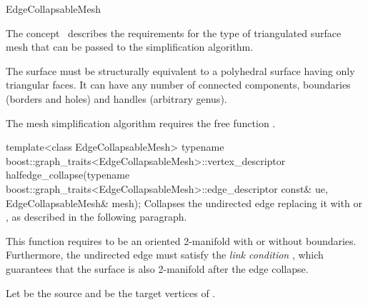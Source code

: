 
\begin{ccRefConcept}{EdgeCollapsableMesh}


\ccDefinition

The concept \ccRefName\ describes the requirements for the type of 
triangulated surface mesh that can be passed to the
simplification algorithm.

The surface must be structurally equivalent to a polyhedral surface
having only triangular faces. 
It can have any number of connected components, boundaries 
(borders and holes) and handles (arbitrary genus).

\ccRefines
{}


The mesh simplification algorithm requires the free function .
\ccTagFullDeclarations

  \ccFunction
  {template<class EdgeCollapsableMesh>
  typename boost::graph_traits<EdgeCollapsableMesh>::vertex_descriptor
  halfedge_collapse(typename boost::graph_traits<EdgeCollapsableMesh>::edge_descriptor const& ue,
                             EdgeCollapsableMesh& mesh);}  
  {Collapses the undirected edge  replacing it with  or ,
   as described in the following paragraph.}

    

\ccPrecond This function requires  to be an oriented 2-manifold with or without boundaries. Furthermore, the undirected edge  must satisfy the {\em link condition} 
\cite{degn-tpec-98}, which guarantees that the surface is also 2-manifold after the edge collapse. 

\smallskip
Let  be the source and  be the target vertices of .


\end{ccRefConcept}
